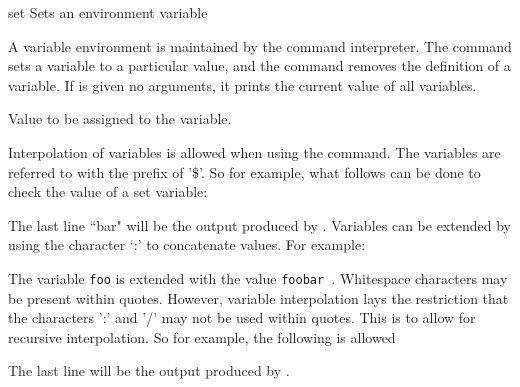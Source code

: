 \begin{nusmvCommand} {set} {Sets an environment variable}
 

A variable environment is maintained by the command interpreter.  The
 command sets a variable to a particular value, and the
 command removes the definition of a variable.  If
 is given no arguments, it prints the current value of
all variables.\\
\begin{cmdOpt}

 {Value to be assigned to the variable.}

\end{cmdOpt}

Interpolation of variables is allowed when using the 
command. The variables are referred to with the prefix of '\$'. So for
example, what follows can be done to check the value of a set
variable:\\

The last line ``bar" will be the output produced by \nusmv.  Variables
can be extended by using the character `:' to concatenate values. For
example: \\

The variable  \texttt{foo} is extended with the value \texttt{foobar
}.  Whitespace characters may be present within quotes. However,
variable interpolation lays the restriction that the characters ':'
and '/' may not be used within quotes. This is to allow for recursive
interpolation.  So for example, the following is allowed\\

The last line will be the output produced by \nusmv. 
  

\end{nusmvCommand}
